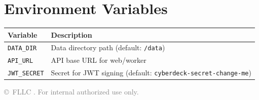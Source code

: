 \documentclass[11pt,a4paper]{article}
\begin{document}
\section{Environment Variables}
\begin{tabular}{lp{8cm}}
\toprule
\textbf{Variable} & \textbf{Description} \\
\midrule
\texttt{DATA\_DIR}  & Data directory path (default: \texttt{/data}) \\
\texttt{API\_URL}   & API base URL for web/worker \\
\texttt{JWT\_SECRET} & Secret for JWT signing (default: \texttt{cyberdeck-secret-change-me}) \\
\bottomrule
\end{tabular}

\vfill
\begin{center}
\textcolor{gray}{\small\copyright\ FLLC \the\year.  For internal authorized use only.}
\end{center}
\end{document}
